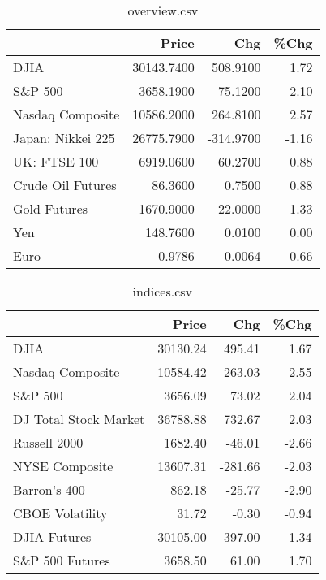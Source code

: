 \documentclass{article}%
\begin{document}
\begin{table}[htbp]%
\caption{overview.csv}%
\centering%
\begin{adjustbox}{width=1\textwidth}%
\begin{tabular}{lrrr}
\toprule
                  &      Price &       Chg &  \%Chg \\
\midrule
             DJIA & 30143.7400 &  508.9100 &  1.72 \\
          S\&P 500 &  3658.1900 &   75.1200 &  2.10 \\
 Nasdaq Composite & 10586.2000 &  264.8100 &  2.57 \\
Japan: Nikkei 225 & 26775.7900 & -314.9700 & -1.16 \\
     UK: FTSE 100 &  6919.0600 &   60.2700 &  0.88 \\
Crude Oil Futures &    86.3600 &    0.7500 &  0.88 \\
     Gold Futures &  1670.9000 &   22.0000 &  1.33 \\
              Yen &   148.7600 &    0.0100 &  0.00 \\
             Euro &     0.9786 &    0.0064 &  0.66 \\
\bottomrule
\end{tabular}
%
\end{adjustbox}%
\end{table}

%


\begin{table}[htbp]%
\caption{indices.csv}%
\centering%
\begin{adjustbox}{width=1\textwidth}%
\begin{tabular}{lrrr}
\toprule
                      &    Price &     Chg &  \%Chg \\
\midrule
                 DJIA & 30130.24 &  495.41 &  1.67 \\
     Nasdaq Composite & 10584.42 &  263.03 &  2.55 \\
              S\&P 500 &  3656.09 &   73.02 &  2.04 \\
DJ Total Stock Market & 36788.88 &  732.67 &  2.03 \\
         Russell 2000 &  1682.40 &  -46.01 & -2.66 \\
       NYSE Composite & 13607.31 & -281.66 & -2.03 \\
         Barron's 400 &   862.18 &  -25.77 & -2.90 \\
      CBOE Volatility &    31.72 &   -0.30 & -0.94 \\
         DJIA Futures & 30105.00 &  397.00 &  1.34 \\
      S\&P 500 Futures &  3658.50 &   61.00 &  1.70 \\
\bottomrule
\end{tabular}
%
\end{adjustbox}%
\end{table}
\end{document}
